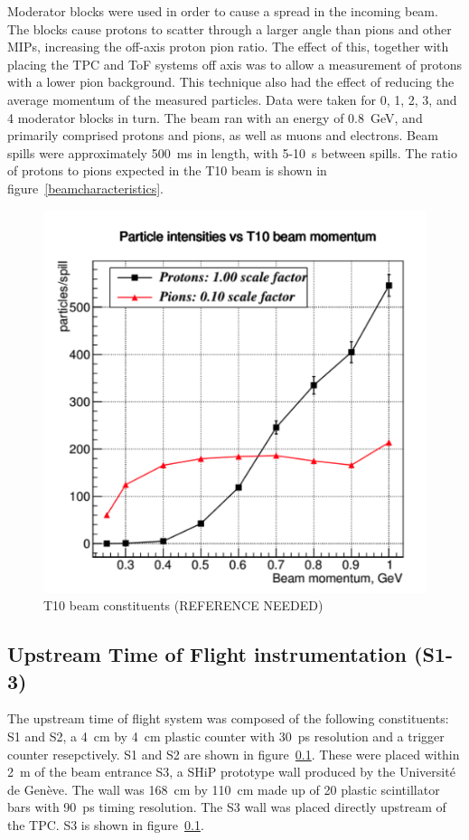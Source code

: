     Moderator blocks were used in order to cause a spread in the incoming beam.
    The blocks cause protons to scatter through a larger angle than pions and other MIPs, increasing the off-axis proton pion ratio.
    The effect of this, together with placing the TPC and ToF systems off axis was to allow a measurement of protons with a lower pion background.
    This technique also had the effect of reducing the average momentum of the measured particles.
    Data were taken for 0, 1, 2, 3, and 4 moderator blocks in turn.
    The beam ran with an energy of 0.8~GeV, and primarily comprised protons and pions, as well as muons and electrons. 
    Beam spills were approximately 500~ms in length, with 5-10~s between spills.
    The ratio of protons to pions expected in the T10 beam  is shown in figure~\ref{beamcharacteristics}.
      \begin{figure}
      \centering
    \includegraphics[width=0.6\linewidth]{files/Figures/offaxismeasurement.png}
    	\caption{T10 beam constituents (REFERENCE NEEDED)}
    		\label{fig:beamcharacteristics}
    \end{figure}
    
    
	\subsection{Upstream Time of Flight instrumentation (S1-3)}
    The upstream time of flight system was composed of the following constituents:
    S1 and S2, a 4~cm by 4~cm plastic counter with 30~ps resolution and a trigger counter resepctively.
    S1 and S2 are shown in figure~\ref{}.
    These were placed within 2~m of the beam entrance
    S3, a SHiP prototype wall produced by the Université de Genève. 
    The wall was 168~cm by 110~cm made up of 20 plastic scintillator bars with 90~ps timing resolution.
    The S3 wall was placed directly upstream of the TPC.
    S3 is shown in figure~\ref{}.

